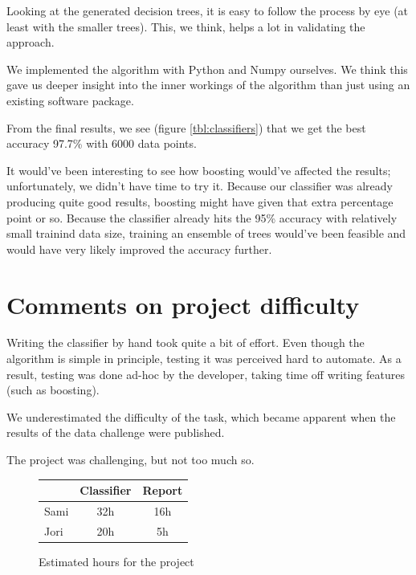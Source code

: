 \documentclass[a4paper,10pt]{article}
\begin{document}
Looking at the generated decision trees, it is easy to follow the
process by eye (at least with the smaller trees).  This, we think, helps
a lot in validating the approach.

We implemented the algorithm with Python and Numpy ourselves.  We think
this gave us deeper insight into the inner workings of the algorithm
than just using an existing software package.

From the final results, we see (figure \ref{tbl:classifiers}) that we
get the best accuracy 97.7\% with 6000 data points.

It would've been interesting to see how
boosting\cite[p. 360]{alpaydin2004} would've affected the results;
unfortunately, we didn't have time to try it.  Because our classifier
was already producing quite good results, boosting might have given that
extra percentage point or so.  Because the classifier already hits the
95\% accuracy with relatively small trainind data size, training an
ensemble of trees would've been feasible and would have very likely
improved the accuracy further.

\section{Comments on project difficulty}

Writing the classifier by hand took quite a bit of effort.  Even though
the algorithm is simple in principle, testing it was perceived hard to
automate.  As a result, testing was done ad-hoc by the developer, taking
time off writing features (such as boosting).

We underestimated the difficulty of the task, which became apparent when
the results of the data challenge were published.

The project was challenging, but not too much so.

\begin{figure}
  \centering
\begin{tabular}{|l|c|c|}
\hline
 & Classifier & Report \\ \hline
Sami & 32h & 16h \\ %
Jori & 20h & 5h  \\ %
\hline
\end{tabular}
  \caption{Estimated hours for the project}
  \label{tbl:effort-estimate} 
\end{figure}
\end{document}
